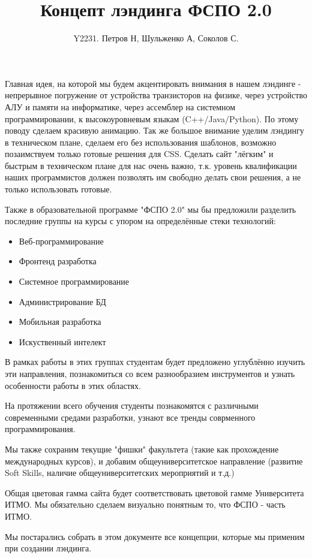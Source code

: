 \documentclass[14pt]{extarticle}
\title{Концепт лэндинга ФСПО 2.0}
\author{Y2231. Петров Н, Шульженко А, Соколов С.}
\begin{document}
  \maketitle
  \hspace{1.25em}Главная идея, на которой мы будем акцентировать внимания в нашем лэндинге - непрерывное погружение от устройства транзисторов на физике, через устройство АЛУ и памяти на информатике, через ассемблер на системном программировании, к высокоуровневым языкам (C++/Java/Python).
  По этому поводу сделаем красивую анимацию.
  Так же большое внимание уделим лэндингу в техническом плане, сделаем его без использования шаблонов, возможно позаимствуем только готовые решения для CSS.
  Сделать сайт "лёгким" и быстрым в техническом плане для нас очень важно, т.к. уровень квалификации наших программистов должен позволять им свободно делать свои решения, а не только использовать готовые.

  \hspace{1.25em}Также в образовательной программе "ФСПО 2.0" мы бы предложили разделить последние группы на курсы с упором на определённые стеки технологий:
  \begin{itemize}
    \item Веб-программирование
    \item Фронтенд разработка
    \item Системное программирование
    \item Администрирование БД
    \item Мобильная разработка
    \item Искуственный интелект
  \end{itemize}
  В рамках работы в этих группах студентам будет предложено углублённо изучить эти направления, познакомиться со всем разнообразием инструментов и узнать особенности работы в этих областях.

  \hspace{1.25em}На протяжении всего обучения студенты познакомятся с различными современными средами разработки, узнают все тренды соврменного программирования.

  \hspace{1.25em}Мы также сохраним текущие "фишки" факультета (такие как прохождение международных курсов), и добавим общеуниверситетское направление (развитие Soft Skills, наличие общеуниверситетских мероприятий и т.д.)

  \hspace{1.25em}Общая цветовая гамма сайта будет соответствовать цветовой гамме Университета ИТМО.
  Мы обязательно сделаем визуально понятным то, что ФСПО - часть ИТМО.

  \hspace{1.25em}Мы постарались собрать в этом документе все концепции, которые мы применим при создании лэндинга.
\end{document}
